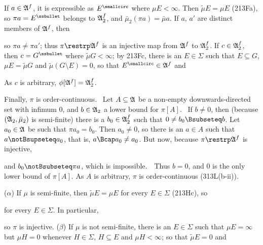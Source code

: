 {If $a\in\frak A^f$, it is expressible as $E^{\smallcirc}$ where
$\mu E<\infty$.   Then $\tilde\mu E=\mu E$ (213Fa), so
$\pi a=E^{\ssbullet}$ belongs to $\frak A_2^f$, and
$\bar\mu_2(\pi a)=\bar\mu a$.   If $a$, $a'$
are distinct members of $\frak A^f$, then


\noindent so $\pi a\ne\pi a'$;  thus $\pi\restrp\frak A^f$ is an
injective
map from $\frak A^f$ to $\frak A_2^f$.   If $c\in\frak A_2^f$, then
$c=G^{\ssbullet}$ where $\tilde\mu G<\infty$;   by 213Fc, there is an
$E\in\Sigma$ such that $E\subseteq G$, $\mu E=\tilde\mu G$ and
$\tilde\mu(G\setminus E)=0$, so that $E^{\smallcirc}\in\frak A^f$ and


\noindent As $c$ is arbitrary, $\phi[\frak A^f]=\frak A_2^f$.

Finally, $\pi$ is order-continuous.   \Prf\  Let $A\subseteq\frak A$ be
a non-empty downwards-directed set with infimum $0$, and $b\in\frak A_2$
a lower bound for $\pi[A]$.   \Quer\ If $b\ne 0$, then (because $(\frak
A_2,\bar\mu_2)$ is semi-finite) there is a $b_0\in\frak A_2^f$ such that
$0\ne b_0\Bsubseteq b$.   Let $a_0\in\frak A$ be such that $\pi
a_0=b_0$.   Then $a_0\ne 0$, so there is an $a\in A$ such that
$a\notBsupseteq a_0$,
that is, $a\Bcap a_0\ne a_0$.   But now, because $\pi\restrp\frak A^f$
is injective,


\noindent and $b_0\notBsubseteq\pi a$, which is
impossible.\ \BanG\ Thus $b=0$, and $0$ is the only lower bound of
$\pi[A]$.   As $A$ is arbitrary, $\pi$ is order-continuous
(313L(b-ii)).\ \Qed

\medskip

 ($\alpha$) If $\mu$ is semi-finite, then
$\tilde\mu E=\mu E$ for every $E\in\Sigma$ (213Hc), so


\noindent for every $E\in\Sigma$.   In particular,


\noindent so $\pi$ is injective.   ($\beta$) If $\mu$ is not
semi-finite, there is an $E\in\Sigma$ such that $\mu E=\infty$ but $\mu
H=0$
whenever $H\in\Sigma$, $H\subseteq E$ and $\mu H<\infty$;  so that
$\tilde\mu E=0$ and

}
